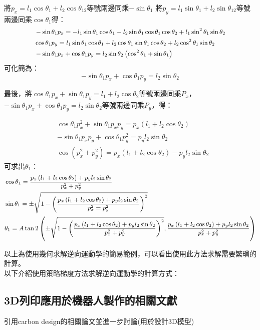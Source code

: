 \documentclass[class=NCU_thesis, crop=false]{standalone}
\begin{document}
將$p_{x}=l_1 \cos \theta_1+l_2 \cos \theta_{12}$等號兩邊同乘$-\sin \theta_1$
將$p_{y}=l_1 \sin \theta_1+l_2 \sin \theta_{12}$等號兩邊同乘$\cos \theta_1$得：
$$
\begin{small}
\begin{aligned}
& -\sin \theta_1 p_{x}=-l_1 \sin \theta_1 \cos \theta_1-l_2 \sin \theta_1 \cos \theta_1 \cos \theta_2+l_1 \sin^2 \theta_1 \sin \theta_2 \\
& \cos \theta_1 p_{y}=l_1 \sin \theta_1 \cos \theta_1+l_2 \cos \theta_1 \sin \theta_1 \cos \theta_2+l_2 \cos^2 \theta_1 \sin \theta_2 \\
& -\sin \theta_1 p_{x}+\cos \theta_1 p_{y}=l_2 \sin \theta_2\left(\cos^2 \theta_1+\sin \theta_1\right)
\end{aligned}
\end{small}
$$
可化簡為：
$$
-\sin \theta_1 p_{x} + \cos \theta_1 p_{y} = l_2 \sin \theta_2
$$

最後，將$\cos \theta_1 p_{x}+\sin \theta_1 p_{y}=l_1+l_2 \cos \theta_2$等號兩邊同乘$P_x$，$-\sin \theta_1 p_{x} + \cos \theta_1 p_{y} = l_2 \sin \theta_2$等號兩邊同乘$P_y$，得：

$$
\begin{aligned}
& \cos \theta_1 p_{x}^2 + \sin \theta_1 p_x p_y = p_x \left(l_1 + l_2 \cos \theta_2 \right) \\
& - \sin \theta_1 p_x p_y + \cos \theta_1 p_{y}^2 = p_y l_2 \sin \theta_2 \\
& \cos \left(p_{x}^2+p_{y}^2 \right) = p_x \left(l_1+l_2 \cos \theta_2 \right) - p_y l_2 \sin \theta_2
\end{aligned}
$$
可求出$\theta_1$：
$$
\begin{small}
\begin{aligned}
& \cos \theta_1= \frac{p_x \left(l_1+l_2 \cos \theta_2 \right)+p_y l_2 \sin \theta_2}{p_x^2 + p_y^2} \\
& \sin \theta_1= \pm \sqrt{1-\left(\frac{p_{x} \left(l_1 + l_2 \cos \theta_2 \right)+p_y l_2 \sin \theta_2}{p_x^2 = p_y^2}\right)^2} \\
& \theta_1=A \tan 2\left( \pm \sqrt{1-\left(\frac{p_{x}\left(l_1+l_2 \cos \theta_2\right)+p_{y} l_2 \sin \theta_2}{p_{x}^2+p_{y}^2}\right)^2}, \frac{p_{x}\left(l_1+l_2 \cos \theta_2\right)+p_{y} l_2 \sin \theta_2}{p_{x}^2+p_{y}^2}\right)
\end{aligned}
\end{small}
$$

以上為使用幾何求解逆向運動學的簡易範例，可以看出使用此方法求解需要繁瑣的計算。 \\
以下介紹使用策略梯度方法求解逆向運動學的計算方式：

\subsection{3D列印應用於機器人製作的相關文獻}
引用carbon design的相關論文並進一步討論(用於設計3D模型)
\end{document}
